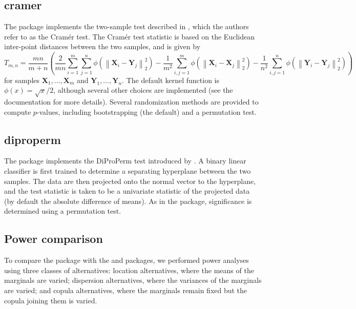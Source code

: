 \subsection{cramer}
The  package \citep{cramerR} implements the two-sample test described in \citet{baringhaus_2004}, which the authors refer to as the Cram\'er test. The Cram\'er test statistic is based on the Euclidean inter-point distances between the two samples, and is given by
\begin{equation*}
T_{m,n}=\frac{mn}{m+n}\left(\frac{2}{mn}\sum_{i=1}^{m}\sum_{j=1}^{n}\phi\left(\left\lVert\mathbf{X}_{i}-\mathbf{Y}_{j}\right\rVert_{2}^{2}\right)-\frac{1}{m^{2}}\sum_{i,j=1}^{m}\phi\left(\left\lVert\mathbf{X}_{i}-\mathbf{X}_{j}\right\rVert_{2}^{2}\right)-\frac{1}{n^{2}}\sum_{i,j=1}^{n}\phi\left(\left\lVert\mathbf{Y}_{i}-\mathbf{Y}_{j}\right\rVert_{2}^{2}\right)\right)
\end{equation*}
for samples $\mathbf{X}_{1},\dots,\mathbf{X}_{m}$ and $\mathbf{Y}_{1},\dots,\mathbf{Y}_{n}$. The default kernel function is $\phi(x)=\sqrt{x}/2$, although several other choices are implemented (see the documentation for more details). Several randomization methods are provided to compute $p$-values, including bootstrapping (the default) and a permutation test.

\subsection{diproperm}
The  package \citep{dipropermR} implements the DiProPerm test introduced by \citet{diproperm_original}. A binary linear classifier is first trained to determine a separating hyperplane between the two samples. The data are then projected onto the normal vector to the hyperplane, and the test statistic is taken to be a univariate statistic of the projected data (by default the absolute difference of means). As in the  package, significance is determined using a permutation test.

\subsection{Power comparison}
To compare the  package with the  and  packages, we performed power analyses using three classes of alternatives: location alternatives, where the means of the marginals are varied; dispersion alternatives, where the variances of the marginals are varied; and copula alternatives, where the marginals remain fixed but the copula joining them is varied.

